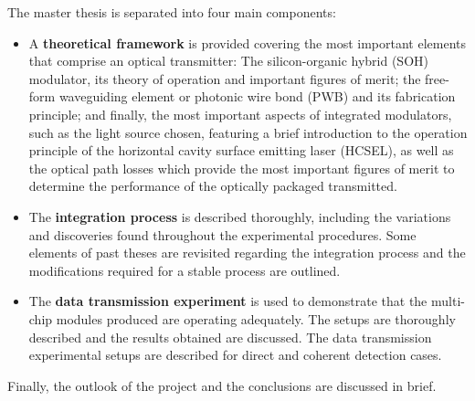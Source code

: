 The master thesis is separated into four main components:
\begin{itemize}
\item A \textbf{theoretical framework} is provided covering the most important elements that comprise an optical transmitter: The silicon-organic hybrid (SOH) modulator, its theory of operation and important figures of merit; the free-form waveguiding element or photonic wire bond (PWB) and its fabrication principle; and finally, the most important aspects of integrated modulators, such as the light source chosen, featuring a brief introduction to the operation principle of the horizontal cavity surface emitting laser (HCSEL), as well as the optical path losses which provide the most important figures of merit to determine the performance of the optically packaged transmitted.
\item The \textbf{integration process} is described thoroughly, including the variations and discoveries found throughout the experimental procedures. Some elements of past theses are revisited regarding the integration process and the modifications required for a stable process are outlined.
\item The \textbf{data transmission experiment} is used to demonstrate that the multi-chip modules produced are operating adequately. The setups are thoroughly described and the results obtained are discussed. The data transmission experimental setups are described for direct and coherent detection cases. 
\end{itemize}

Finally, the outlook of the project and the conclusions are discussed in brief.



